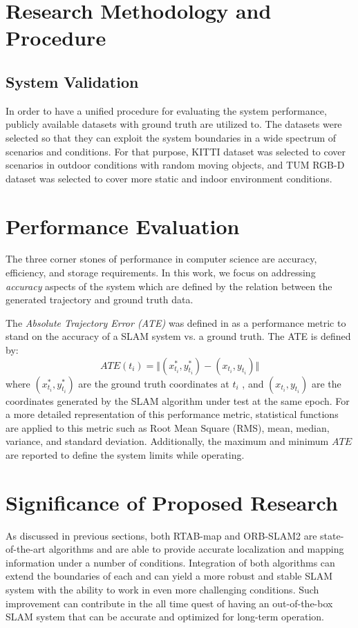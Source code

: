 \documentclass[12pt]{article}
\begin{document}
\section{Research Methodology and Procedure}
\subsection{System Validation}
In order to have a unified procedure for evaluating the system performance, publicly available datasets with ground truth are utilized to. The datasets were selected so that they can exploit the system boundaries in a wide spectrum of scenarios and conditions. For that purpose, KITTI dataset \cite{Geiger2012CVPR} was selected to cover scenarios in outdoor conditions with random moving objects, and TUM RGB-D dataset \cite{sturm2012benchmark} was selected to cover more static and indoor environment conditions.

\section{Performance Evaluation}
The three corner stones of performance in computer science are accuracy, efficiency, and storage requirements. In this work, we focus on addressing \textit{accuracy} aspects of the system which are defined by the relation between the generated trajectory and ground truth data. 

The \textit{Absolute Trajectory Error (ATE)} was defined in \cite{8710464} as a performance metric to stand on the accuracy of a SLAM system vs. a ground truth. The ATE is defined by:
\begin{equation}
ATE(t_i) = \Vert (x_{t_i}^*,y_{t_i}^*) - (x_{t_i},y_{t_i}) \Vert
\end{equation}
where $(x_{t_i}^*,y_{t_i}^*)$ are the ground truth coordinates at $t_i$ , and $(x_{t_i},y_{t_i})$ are the coordinates generated by the SLAM algorithm under test at the same epoch. For a more detailed representation of this performance metric, statistical functions are applied to this metric such as Root Mean Square (RMS), mean, median, variance, and standard deviation. Additionally, the maximum and minimum $ATE$ are reported to define the system limits while operating. 
\section{Significance of Proposed Research}
As discussed in previous sections, both RTAB-map and ORB-SLAM2 are state-of-the-art algorithms and are able to provide accurate localization and mapping information under a number of conditions. Integration of both algorithms can extend the boundaries of each and can yield a more robust and stable SLAM system with the ability to work in even more challenging conditions. Such improvement can contribute in the all time quest of having an out-of-the-box SLAM system \cite{cadena2016past} that can be accurate and optimized for long-term operation.

\newpage


 
\end{document}
